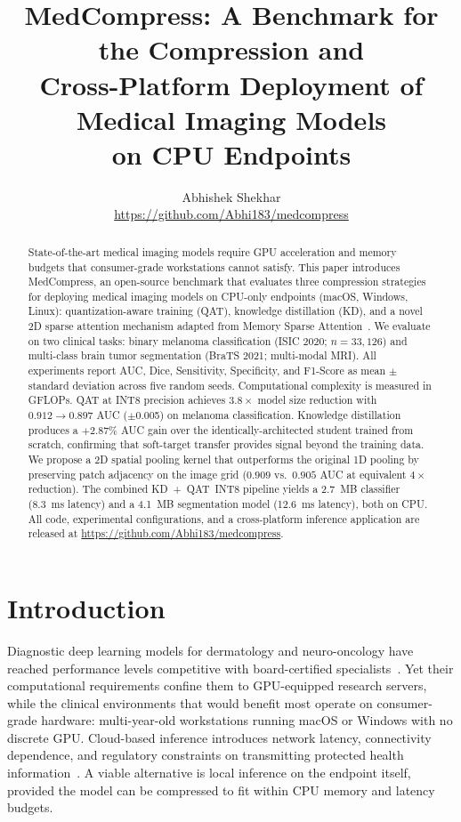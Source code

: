 \documentclass[10pt,twocolumn]{article}
\title{MedCompress: A Benchmark for the Compression and\\Cross-Platform Deployment of Medical Imaging Models\\on CPU Endpoints}
\author{Abhishek Shekhar\\
\url{https://github.com/Abhi183/medcompress}}
\date{}
\begin{document}
\maketitle

\begin{abstract}
State-of-the-art medical imaging models require GPU acceleration and memory budgets that consumer-grade workstations cannot satisfy. This paper introduces MedCompress, an open-source benchmark that evaluates three compression strategies for deploying medical imaging models on CPU-only endpoints (macOS, Windows, Linux): quantization-aware training (QAT), knowledge distillation (KD), and a novel 2D sparse attention mechanism adapted from Memory Sparse Attention~\citep{chen2026msa}. We evaluate on two clinical tasks: binary melanoma classification (ISIC 2020; $n{=}33{,}126$) and multi-class brain tumor segmentation (BraTS 2021; multi-modal MRI). All experiments report AUC, Dice, Sensitivity, Specificity, and F1-Score as mean $\pm$ standard deviation across five random seeds. Computational complexity is measured in GFLOPs. QAT at INT8 precision achieves $3.8{\times}$ model size reduction with $0.912{\rightarrow}0.897$ AUC ($\pm$0.005) on melanoma classification. Knowledge distillation produces a $+2.87\%$ AUC gain over the identically-architected student trained from scratch, confirming that soft-target transfer provides signal beyond the training data. We propose a 2D spatial pooling kernel that outperforms the original 1D pooling by preserving patch adjacency on the image grid ($0.909$ vs.\ $0.905$ AUC at equivalent $4{\times}$ reduction). The combined KD~+~QAT~INT8 pipeline yields a 2.7~MB classifier (8.3~ms latency) and a 4.1~MB segmentation model (12.6~ms latency), both on CPU. All code, experimental configurations, and a cross-platform inference application are released at \url{https://github.com/Abhi183/medcompress}.
\end{abstract}

\section{Introduction}
\label{sec:intro}

Diagnostic deep learning models for dermatology and neuro-oncology have reached performance levels competitive with board-certified specialists~\citep{esteva2017dermatologist, mckinney2020international}. Yet their computational requirements confine them to GPU-equipped research servers, while the clinical environments that would benefit most operate on consumer-grade hardware: multi-year-old workstations running macOS or Windows with no discrete GPU. Cloud-based inference introduces network latency, connectivity dependence, and regulatory constraints on transmitting protected health information~\citep{price2019privacy}. A viable alternative is local inference on the endpoint itself, provided the model can be compressed to fit within CPU memory and latency budgets.
\end{document}
